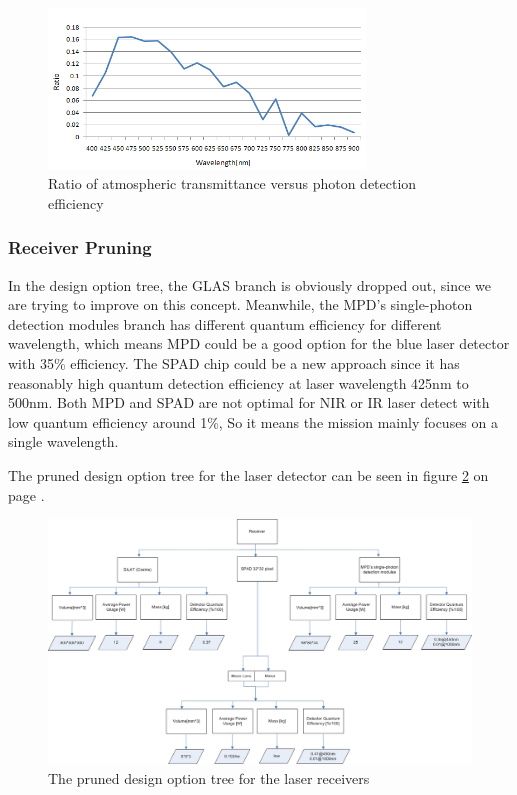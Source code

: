 \begin{figure}[ht!]
\centering
\includegraphics[width=0.75\textwidth]{chapters/img/wavelength_estimation.png}
\caption{Ratio of atmospheric transmittance versus photon detection efficiency}
\label{fig:wavelength_estimation}
\end{figure}

\subsubsection{Receiver Pruning}
\label{TOReceiverP}
In the design option tree, the GLAS branch is obviously dropped out, since we are trying to improve on this concept. Meanwhile, the \ac{MPD}'s single-photon detection modules branch has different quantum efficiency for different wavelength, which means MPD could be a good option for the blue laser detector with 35\% efficiency. The \ac{SPAD} chip could be a new approach since it has reasonably high quantum detection efficiency at laser wavelength 425nm to 500nm. Both \acs{MPD} and \acs{SPAD} are not optimal for \acs{NIR} or \acs{IR} laser detect with low quantum efficiency around 1\%, So it means the mission mainly focuses on a single wavelength.

The pruned design option tree for the laser detector can be seen in figure \ref{fig:PrunedReceiver} on page \pageref{fig:PrunedReceiver}.

\begin{figure}[ht!]
\centering
\includegraphics[width=0.75\textheight, angle=90]{chapters/img/DOTreceiverPruned.jpg}
\caption{The pruned design option tree for the laser receivers}
\label{fig:PrunedReceiver}
\end{figure}

